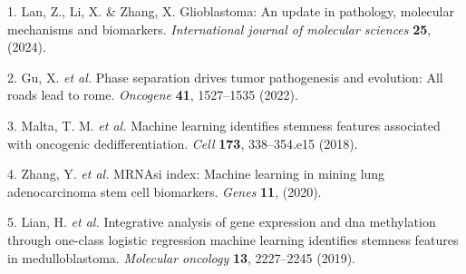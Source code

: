 \documentclass[
]{article}
\newenvironment{cslreferences}%
  {}%
  {\par}
\begin{document}
\hypertarget{refs}{}
\begin{cslreferences}
\leavevmode\hypertarget{ref-Glioblastoma_A_Lan_Z_2024}{}%
1. Lan, Z., Li, X. \& Zhang, X. Glioblastoma: An update in pathology, molecular mechanisms and biomarkers. \emph{International journal of molecular sciences} \textbf{25}, (2024).

\leavevmode\hypertarget{ref-Phase_separatio_Gu_Xi_2022}{}%
2. Gu, X. \emph{et al.} Phase separation drives tumor pathogenesis and evolution: All roads lead to rome. \emph{Oncogene} \textbf{41}, 1527--1535 (2022).

\leavevmode\hypertarget{ref-Machine_Learnin_Malta_2018}{}%
3. Malta, T. M. \emph{et al.} Machine learning identifies stemness features associated with oncogenic dedifferentiation. \emph{Cell} \textbf{173}, 338--354.e15 (2018).

\leavevmode\hypertarget{ref-mRNAsi_Index_M_Zhang_2020}{}%
4. Zhang, Y. \emph{et al.} MRNAsi index: Machine learning in mining lung adenocarcinoma stem cell biomarkers. \emph{Genes} \textbf{11}, (2020).

\leavevmode\hypertarget{ref-Integrative_ana_Lian_2019}{}%
5. Lian, H. \emph{et al.} Integrative analysis of gene expression and dna methylation through one-class logistic regression machine learning identifies stemness features in medulloblastoma. \emph{Molecular oncology} \textbf{13}, 2227--2245 (2019).
\end{cslreferences}
\end{document}
